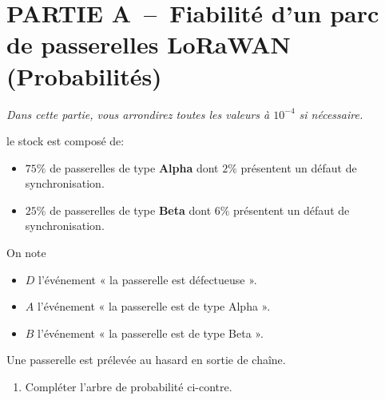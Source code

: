 
\pagestyle{DS_FP}

\bigskip

\section*{PARTIE A~--~Fiabilité d'un parc de passerelles LoRaWAN (Probabilités)}

\medskip

\emph{Dans cette partie, vous arrondirez toutes les valeurs à $10^{-4}$ si nécessaire.}

\medskip

 \begin{minipage}{0.48\textwidth}
le stock est composé de:
\begin{itemize}
    \item $75\%$ de passerelles de type \textbf{Alpha} dont $2\%$ présentent un défaut de synchronisation.
    \item $25\%$ de passerelles de type \textbf{Beta} dont $6\%$ présentent un défaut de synchronisation.
\end{itemize}

On note 
\begin{itemize}
    \item $D$ l'événement « la passerelle est défectueuse ».
    \item $A$ l'événement « la passerelle est de type Alpha ».
    \item $B$ l'événement « la passerelle est de type Beta ».
\end{itemize}


Une passerelle est prélevée au hasard en sortie de chaîne.

\medskip

\begin{enumerate}[series=monDS, resume]
    \item Compléter l'arbre de probabilité ci-contre.
\end{enumerate}

\end{minipage}\hfill{}

